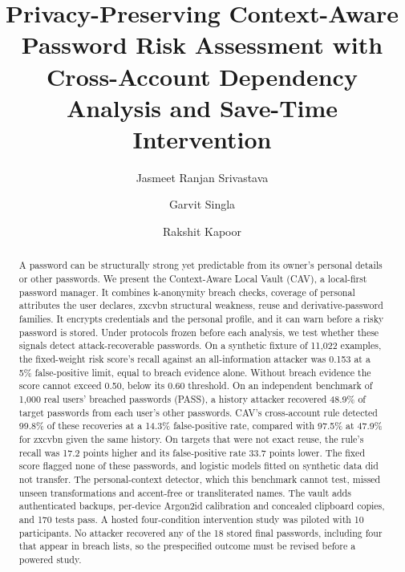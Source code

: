 \documentclass[preprint,12pt]{elsarticle}
\begin{document}
\begin{frontmatter}
\title{Privacy-Preserving Context-Aware Password Risk Assessment with Cross-Account Dependency Analysis and Save-Time Intervention}
\author[vit]{Jasmeet Ranjan Srivastava}
\author[vit]{Garvit Singla}
\author[vit]{Rakshit Kapoor}
\begin{abstract}
A password can be structurally strong yet predictable from its owner's personal details or other passwords. We present the Context-Aware Local Vault (CAV), a local-first password manager. It combines k-anonymity breach checks, coverage of personal attributes the user declares, zxcvbn structural weakness, reuse and derivative-password families. It encrypts credentials and the personal profile, and it can warn before a risky password is stored. Under protocols frozen before each analysis, we test whether these signals detect attack-recoverable passwords. On a synthetic fixture of 11,022 examples, the fixed-weight risk score's recall against an all-information attacker was 0.153 at a 5\% false-positive limit, equal to breach evidence alone. Without breach evidence the score cannot exceed 0.50, below its 0.60 threshold. On an independent benchmark of 1,000 real users' breached passwords (PASS), a history attacker recovered 48.9\% of target passwords from each user's other passwords. CAV's cross-account rule detected 99.8\% of these recoveries at a 14.3\% false-positive rate, compared with 97.5\% at 47.9\% for zxcvbn given the same history. On targets that were not exact reuse, the rule's recall was 17.2 points higher and its false-positive rate 33.7 points lower. The fixed score flagged none of these passwords, and logistic models fitted on synthetic data did not transfer. The personal-context detector, which this benchmark cannot test, missed unseen transformations and accent-free or transliterated names. The vault adds authenticated backups, per-device Argon2id calibration and concealed clipboard copies, and 170 tests pass. A hosted four-condition intervention study was piloted with 10 participants. No attacker recovered any of the 18 stored final passwords, including four that appear in breach lists, so the prespecified outcome must be revised before a powered study.
\end{abstract}
\begin{highlights}

\end{highlights}
\end{frontmatter}
\end{document}
